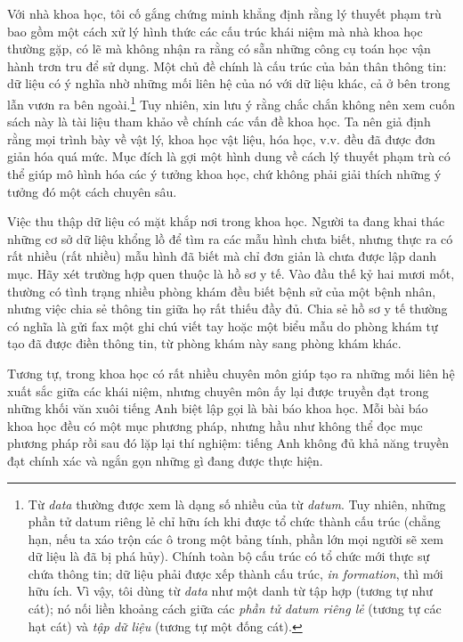 Với nhà khoa học, tôi cố gắng chứng minh khẳng định rằng lý thuyết phạm trù bao gồm một cách xử lý hình thức các cấu trúc khái niệm mà nhà khoa học thường gặp, có lẽ mà không nhận ra rằng có sẵn những công cụ toán học vận hành trơn tru để sử dụng. Một chủ đề chính là cấu trúc của bản thân thông tin: dữ liệu có ý nghĩa nhờ những mối liên hệ của nó với dữ liệu khác, cả ở bên trong lẫn vươn ra bên ngoài.\footnote{Từ \emph{data} thường được xem là dạng số nhiều của từ \emph{datum}. Tuy nhiên, những phần tử datum riêng lẻ chỉ hữu ích khi được tổ chức thành cấu trúc (chẳng hạn, nếu ta xáo trộn các ô trong một bảng tính, phần lớn mọi người sẽ xem dữ liệu là đã bị phá hủy). Chính toàn bộ cấu trúc có tổ chức mới thực sự chứa thông tin; dữ liệu phải được xếp thành cấu trúc, \emph{in formation}, thì mới hữu ích. Vì vậy, tôi dùng từ \emph{data} như một danh từ tập hợp (tương tự như cát); nó nối liền khoảng cách giữa các \emph{phần tử datum riêng lẻ} (tương tự các hạt cát) và \emph{tập dữ liệu} (tương tự một đống cát).} Tuy nhiên, xin lưu ý rằng chắc chắn không nên xem cuốn sách này là tài liệu tham khảo về chính các vấn đề khoa học. Ta nên giả định rằng mọi trình bày về vật lý, khoa học vật liệu, hóa học, v.v. đều đã được đơn giản hóa quá mức. Mục đích là gợi một hình dung về cách lý thuyết phạm trù có thể giúp mô hình hóa các ý tưởng khoa học, chứ không phải giải thích những ý tưởng đó một cách chuyên sâu.

Việc thu thập dữ liệu có mặt khắp nơi trong khoa học. Người ta đang khai thác những cơ sở dữ liệu khổng lồ để tìm ra các mẫu hình chưa biết, nhưng thực ra có rất nhiều (rất nhiều) mẫu hình đã biết mà chỉ đơn giản là chưa được lập danh mục. Hãy xét trường hợp quen thuộc là hồ sơ y tế. Vào đầu thế kỷ hai mươi mốt, thường có tình trạng nhiều phòng khám đều biết bệnh sử của một bệnh nhân, nhưng việc chia sẻ thông tin giữa họ rất thiếu đầy đủ. Chia sẻ hồ sơ y tế thường có nghĩa là gửi fax một ghi chú viết tay hoặc một biểu mẫu do phòng khám tự tạo đã được điền thông tin, từ phòng khám này sang phòng khám khác.

Tương tự, trong khoa học có rất nhiều chuyên môn giúp tạo ra những mối liên hệ xuất sắc giữa các khái niệm, nhưng chuyên môn ấy lại được truyền đạt trong những khối văn xuôi tiếng Anh biệt lập gọi là bài báo khoa học. Mỗi bài báo khoa học đều có một mục phương pháp, nhưng hầu như không thể đọc mục phương pháp rồi sau đó lặp lại thí nghiệm: tiếng Anh không đủ khả năng truyền đạt chính xác và ngắn gọn những gì đang được thực hiện.

